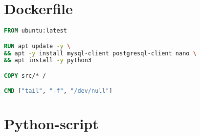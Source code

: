 \chapter{Dockerfile}
\label{sec:dockerfile}
\begin{lstlisting}[language=Dockerfile, caption={Dockerfile gebruikt voor de images van de Kubernetes pods in de POC.}]
FROM ubuntu:latest

RUN apt update -y \
&& apt -y install mysql-client postgresql-client nano \
&& apt install -y python3

COPY src/* /

CMD ["tail", "-f", "/dev/null"]
\end{lstlisting}

\chapter{Python-script}
\label{sec:python}
